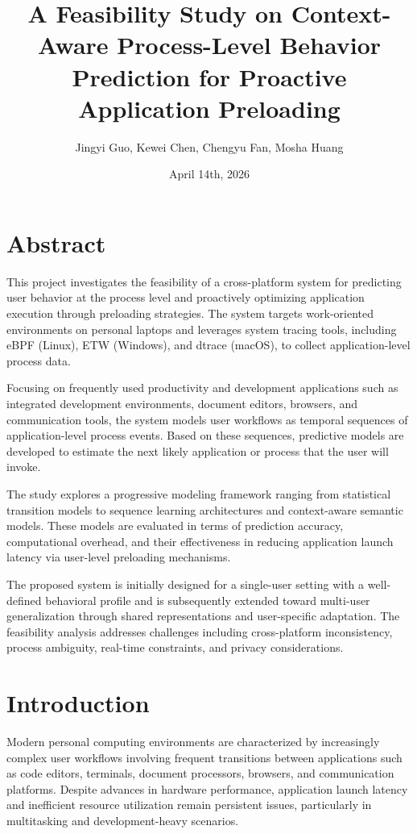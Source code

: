 \documentclass[11pt]{article}
\title{A Feasibility Study on Context-Aware Process-Level Behavior Prediction for Proactive Application Preloading}
\author{Jingyi Guo, Kewei Chen, Chengyu Fan, Mosha Huang}
\date{April 14th, 2026}
\begin{document}
\maketitle

\section{Abstract}

This project investigates the feasibility of a cross-platform system for predicting user behavior at the process level and proactively optimizing application execution through preloading strategies. The system targets work-oriented environments on personal laptops and leverages system tracing tools, including eBPF (Linux), ETW (Windows), and dtrace (macOS), to collect application-level process data.

Focusing on frequently used productivity and development applications such as integrated development environments, document editors, browsers, and communication tools, the system models user workflows as temporal sequences of application-level process events. Based on these sequences, predictive models are developed to estimate the next likely application or process that the user will invoke.

The study explores a progressive modeling framework ranging from statistical transition models to sequence learning architectures and context-aware semantic models. These models are evaluated in terms of prediction accuracy, computational overhead, and their effectiveness in reducing application launch latency via user-level preloading mechanisms.

The proposed system is initially designed for a single-user setting with a well-defined behavioral profile and is subsequently extended toward multi-user generalization through shared representations and user-specific adaptation. The feasibility analysis addresses challenges including cross-platform inconsistency, process ambiguity, real-time constraints, and privacy considerations.

\section{Introduction}

Modern personal computing environments are characterized by increasingly complex user workflows involving frequent transitions between applications such as code editors, terminals, document processors, browsers, and communication platforms. Despite advances in hardware performance, application launch latency and inefficient resource utilization remain persistent issues, particularly in multitasking and development-heavy scenarios.
\end{document}

